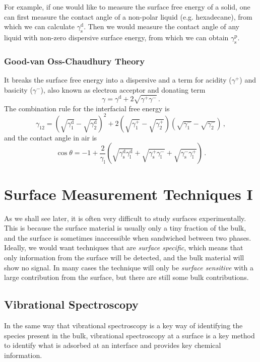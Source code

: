 \documentclass{article}
\theoremstyle{plain}\theoremheaderfont{\normalfont\itshape}\theorembodyfont{\rmfamily}\theoremseparator{.}\newtheorem*{rem}{Remark}\newtheorem*{ex}{Example}\newtheorem*{proof}{Proof}\newtheorem*{altp}{Alternative proof}
\theoremstyle{plain}\theoremheaderfont{\normalfont\bfseries}\theorembodyfont{\rmfamily}\theoremseparator{.}\newtheorem{thm}{Theorem}[section]\newtheorem{lem}[thm]{Lemma}\newtheorem{prop}[thm]{Proposition}\newtheorem*{cor}{Corollary}\newtheorem{defn}[thm]{Definition}\newtheorem{clm}[thm]{Claim}\newtheorem{clminproof}{Claim}\newtheorem*{law}{Law}\newtheorem{pos}[thm]{Postulate}
\theoremstyle{break}\theoremheaderfont{\normalfont\itshape}\theorembodyfont{\rmfamily}\theoremseparator{.\medskip}\newtheorem*{proofskip}{Proof}\newtheorem*{exs}{Examples}\newtheorem*{rems}{Remarks}
\theoremstyle{break}\theoremheaderfont{\normalfont\bfseries}\theorembodyfont{\rmfamily}\theoremseparator{.\medskip}\newtheorem{lemskip}[thm]{Lemma}\newtheorem{defnskip}[thm]{Definition}\newtheorem{propskip}[thm]{Proposition}\newtheorem{thmskip}[thm]{Theorem}
\numberwithin{equation}{section}
\begin{document}
	For example, if one would like to measure the surface free energy of a solid, one can first measure the contact angle of a non-polar liquid (e.g. hexadecane), from which we can calculate \(\gamma_{\text{s}}^{\text{d}}\). Then we would measure the contact angle of any liquid with non-zero dispersive surface energy, from which we can obtain \(\gamma_{\text{s}}^{\text{p}}\).

	\subsubsection{Good-van Oss-Chaudhury Theory}
	It breaks the surface free energy into a dispersive and a term for acidity (\(\gamma^+\)) and basicity (\(\gamma^-\)), also known as electron acceptor and donating term
	\begin{equation}
		\gamma=\gamma^{\text{d}}+2\sqrt{\gamma^+\gamma^-}\,.
	\end{equation}
	The combination rule for the interfacial free energy is
	\begin{equation}
		\gamma_{12}=\left(\sqrt{\gamma_1^{\text{d}}}-\sqrt{\gamma_2^{\text{d}}}\right)^2+2\left(\sqrt{\gamma_1^+}-\sqrt{\gamma_2^+}\right)\left(\sqrt{\gamma_1^-}-\sqrt{\gamma_2^-}\right)\,,
	\end{equation}
	and the contact angle in air is
	\begin{equation}
		\cos\theta=-1+\frac{2}{\gamma_{\text{l}}}\left(\sqrt{\gamma_{\text{s}}^{\text{d}}\gamma_{\text{l}}^{\text{d}}}+\sqrt{\gamma_{\text{s}}^+\gamma_{\text{l}}^-}+\sqrt{\gamma_{\text{s}}^-\gamma_{\text{l}}^+}\right)\,.
	\end{equation}

	\newpage
	\section{Surface Measurement Techniques I}
	As we shall see later, it is often very difficult to study surfaces experimentally. This is because the surface material is usually only a tiny fraction of the bulk, and the surface is sometimes inaccessible when sandwiched between two phases. Ideally, we would want techniques that are \textit{surface specific}, which means that only information from the surface will be detected, and the bulk material will show no signal. In many cases the technique will only be \textit{surface sensitive} with a large contribution from the surface, but there are still some bulk contributions.

	\subsection{Vibrational Spectroscopy}
	In the same way that vibrational spectroscopy is a key way of identifying the species present in the bulk, vibrational spectroscopy at a surface is a key method to identify what is adsorbed at an interface and provides key chemical information.
\end{document}
